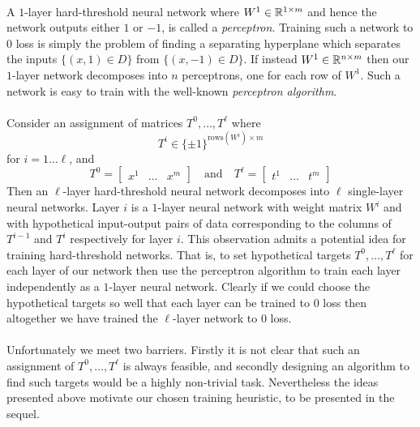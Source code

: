 \paragraph{}
A $1$-layer hard-threshold neural network where $W^1 \in \mathbb{R}^{1\times m}$ and hence the network outputs either $1$ or $-1$, is called a \emph{perceptron}. Training such a network to $0$ loss is simply the problem of finding a separating hyperplane which separates the inputs $\{(x,1) \in D\}$ from $\{(x,-1) \in D\}$. If instead $W^1 \in \mathbb{R}^{n\times m}$ then our $1$-layer network decomposes into $n$ perceptrons, one for each row of $W^1$. Such a network is easy to train with the well-known \emph{perceptron algorithm}\cite{rosenblatt1958perceptron}\cite{novikoff1963convergence}.
\paragraph{}
Consider an assignment of matrices $T^0, \dots, T^\ell$ where $$T^i \in \{\pm 1\}^{\text{rows}(W^i)\times m}$$ for $i =1\dots \ell$, and 
$$T^0 = \begin{bmatrix}
x^1 & \dots & x^m
\end{bmatrix}\quad\text{and}\quad T^\ell = \begin{bmatrix}
t^1 & \dots & t^m
\end{bmatrix}$$
Then an $\ell$-layer hard-threshold neural network decomposes into $\ell$ single-layer neural networks. Layer $i$ is a $1$-layer neural network with weight matrix $W^i$ and with hypothetical input-output pairs of data corresponding to the columns of $T^{i-1}$ and $T^i$ respectively for layer $i$. This observation admits a potential idea for training hard-threshold networks. That is, to set hypothetical targets $T^0, \dots, T^\ell$ for each layer of our network then use the perceptron algorithm to train each layer independently as a $1$-layer neural network. Clearly if we could choose the hypothetical targets so well that each layer can be trained to $0$ loss then altogether we have trained the $\ell$-layer network to $0$ loss.
\paragraph{}
Unfortunately we meet two barriers. Firstly it is not clear that such an assignment of $T^0, \dots, T^\ell$ is always feasible, and secondly designing an algorithm to find such targets would be a highly non-trivial task. Nevertheless the ideas presented above motivate our chosen training heuristic, to be presented in the sequel.
